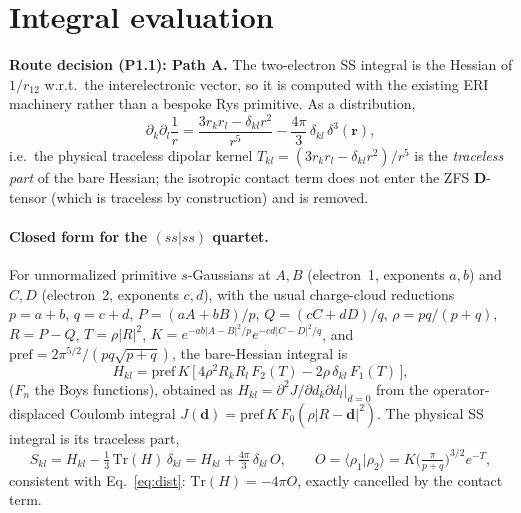 \documentclass[11pt]{article}
\begin{document}
\section{Integral evaluation}\label{sec:integral}
\textbf{Route decision (P1.1): Path A.} The two-electron SS integral is the Hessian of $1/r_{12}$
w.r.t.\ the interelectronic vector, so it is computed with the existing ERI machinery rather than a
bespoke Rys primitive. As a distribution,
\begin{equation}
\partial_k\partial_l\frac{1}{r} = \frac{3r_kr_l-\delta_{kl}r^2}{r^5} - \frac{4\pi}{3}\,\delta_{kl}\,\delta^3(\mathbf r),
\label{eq:dist}
\end{equation}
i.e.\ the physical traceless dipolar kernel $T_{kl}=(3r_kr_l-\delta_{kl}r^2)/r^5$ is the
\emph{traceless part} of the bare Hessian; the isotropic contact term does not enter the ZFS
$\mathbf D$-tensor (which is traceless by construction) and is removed.

\paragraph{Closed form for the $(ss|ss)$ quartet.} For unnormalized primitive $s$-Gaussians at
$A,B$ (electron~1, exponents $a,b$) and $C,D$ (electron~2, exponents $c,d$), with the usual
charge-cloud reductions $p=a+b$, $q=c+d$, $P=(aA+bB)/p$, $Q=(cC+dD)/q$, $\rho=pq/(p+q)$,
$R=P-Q$, $T=\rho|R|^2$, $K=e^{-ab|A-B|^2/p}e^{-cd|C-D|^2/q}$, and
$\mathrm{pref}=2\pi^{5/2}/(pq\sqrt{p+q})$, the bare-Hessian integral is
\begin{equation}
H_{kl} = \mathrm{pref}\,K\,\Big[\,4\rho^2 R_k R_l\,F_2(T) - 2\rho\,\delta_{kl}\,F_1(T)\,\Big],
\label{eq:Hclosed}
\end{equation}
($F_n$ the Boys functions), obtained as $H_{kl}=\partial^2 J/\partial d_k\partial d_l|_{d=0}$ from
the operator-displaced Coulomb integral $J(\mathbf d)=\mathrm{pref}\,K\,F_0(\rho|R-\mathbf d|^2)$.
The physical SS integral is its traceless part,
\begin{equation}
S_{kl} = H_{kl} - \tfrac13\,\mathrm{Tr}(H)\,\delta_{kl} = H_{kl} + \tfrac{4\pi}{3}\,\delta_{kl}\,O,
\qquad O=\langle\rho_1|\rho_2\rangle = K\Big(\tfrac{\pi}{p+q}\Big)^{3/2}e^{-T},
\label{eq:Sclosed}
\end{equation}
consistent with Eq.~\eqref{eq:dist}: $\mathrm{Tr}(H)=-4\pi O$, exactly cancelled by the contact term.
\end{document}
